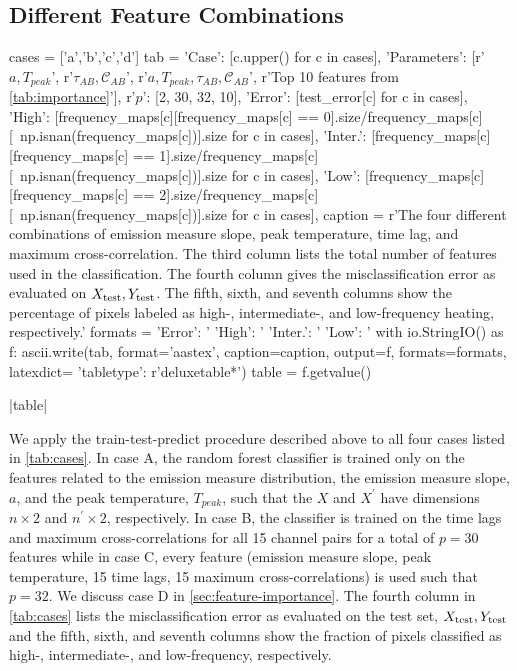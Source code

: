 \subsection{Different Feature Combinations}\label{sec:feature-combos}

\begin{pycode}[manager_ml]
cases = ['a','b','c','d']
tab = {
    'Case': [c.upper() for c in cases],
    'Parameters': [r'$a,T_{peak}$', r'$\tau_{AB},\mathcal{C}_{AB}$', r'$a,T_{peak},\tau_{AB},\mathcal{C}_{AB}$', r'Top 10 features from \autoref{tab:importance}'],
    r'$p$': [2, 30, 32, 10],
    'Error': [test_error[c] for c in cases],
    'High': [frequency_maps[c][frequency_maps[c] == 0].size/frequency_maps[c][~np.isnan(frequency_maps[c])].size for c in cases],
    'Inter.': [frequency_maps[c][frequency_maps[c] == 1].size/frequency_maps[c][~np.isnan(frequency_maps[c])].size for c in cases],
    'Low': [frequency_maps[c][frequency_maps[c] == 2].size/frequency_maps[c][~np.isnan(frequency_maps[c])].size for c in cases],
}
caption = r'The four different combinations of emission measure slope, peak temperature, time lag, and maximum cross-correlation. The third column lists the total number of features used in the classification. The fourth column gives the misclassification error as evaluated on $X_\textup{test},Y_\textup{test}$. The fifth, sixth, and seventh columns show the percentage of pixels labeled as high-, intermediate-, and low-frequency heating, respectively.\label{tab:cases}'
formats = {
    'Error': '%
    'High': '%
    'Inter.': '%
    'Low': '%
}
with io.StringIO() as f:
    ascii.write(tab, format='aastex', caption=caption, output=f, formats=formats, latexdict={ 'tabletype': r'deluxetable*'})
    table = f.getvalue()
\end{pycode}
\py[manager_ml]|table|

We apply the train-test-predict procedure described above to all four cases listed in \autoref{tab:cases}.
In case A, the random forest classifier is trained only on the features related to the emission measure distribution, the emission measure slope, $a$, and the peak temperature, $T_{peak}$, such that the $X$ and $X^\prime$ have dimensions $n\times2$ and $n^\prime\times2$, respectively.
In case B, the classifier is trained on the time lags and maximum cross-correlations for all 15 channel pairs for a total of $p=30$ features while in case C, every feature (emission measure slope, peak temperature, 15 time lags, 15 maximum cross-correlations) is used such that $p=32$.
We discuss case D in \autoref{sec:feature-importance}.
The fourth column in \autoref{tab:cases} lists the misclassification error as evaluated on the test set, $X_\textup{test},Y_\textup{test}$ and the fifth, sixth, and seventh columns show the fraction of pixels classified as high-, intermediate-, and low-frequency, respectively.

